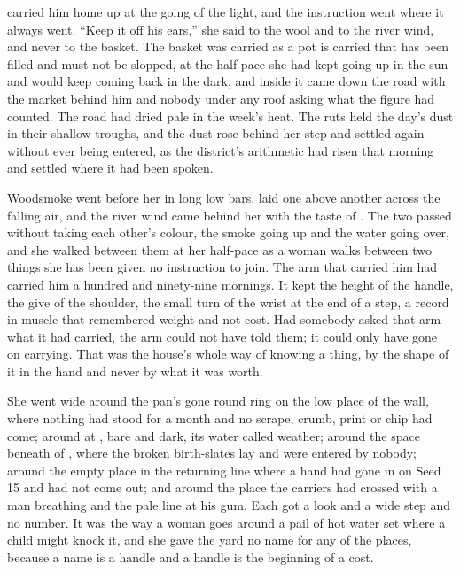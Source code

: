  carried him home up  at the going of the light, and the instruction went where it always went. “Keep it off his ears,” she said to the wool and to the river wind, and never to the basket. The basket was carried as a pot is carried that has been filled and must not be slopped, at the half-pace she had kept going up in the sun and would keep coming back in the dark, and  inside it came down the road with the market behind him and nobody under any roof asking what the figure had counted. The road had dried pale in the week's heat. The ruts held the day's dust in their shallow troughs, and the dust rose behind her step and settled again without ever being entered, as the district's arithmetic had risen that morning and settled where it had been spoken.

Woodsmoke went before her in long low bars, laid one above another across the falling air, and the river wind came behind her with the taste of . The two passed without taking each other's colour, the smoke going up and the water going over, and she walked between them at her half-pace as a woman walks between two things she has been given no instruction to join. The arm that carried him had carried him a hundred and ninety-nine mornings. It kept the height of the handle, the give of the shoulder, the small turn of the wrist at the end of a step, a record in muscle that remembered weight and not cost. Had somebody asked that arm what it had carried, the arm could not have told them; it could only have gone on carrying. That was the house's whole way of knowing a thing, by the shape of it in the hand and never by what it was worth.

She went wide around the pan's gone round ring on the low place of the wall, where nothing had stood for a month and no scrape, crumb, print or chip had come; around  at , bare and dark, its water called weather; around the space beneath  of , where the broken birth-slates lay and were entered by nobody; around the empty place in the returning line where a hand had gone in on Seed 15 and had not come out; and around the place the carriers had crossed with a man breathing and the pale line at his gum. Each got a look and a wide step and no number. It was the way a woman goes around a pail of hot water set where a child might knock it, and she gave the yard no name for any of the places, because a name is a handle and a handle is the beginning of a cost.

